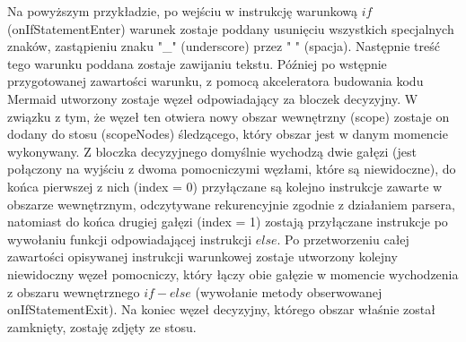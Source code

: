 	Na powyższym przykładzie, po wejściu w instrukcję warunkową $if$ (onIfStatementEnter) warunek zostaje poddany usunięciu wszystkich specjalnych znaków, zastąpieniu znaku "\_" (underscore) przez " " (spacja). Następnie treść tego warunku poddana zostaje zawijaniu tekstu. Później po wstępnie przygotowanej zawartości warunku, z pomocą akceleratora budowania kodu Mermaid utworzony zostaje węzeł odpowiadający za bloczek decyzyjny. W związku z tym, że węzeł ten otwiera nowy obszar wewnętrzny (scope) zostaje on dodany do stosu (scopeNodes) śledzącego, który obszar jest w danym momencie wykonywany. Z bloczka decyzyjnego domyślnie wychodzą dwie gałęzi (jest połączony na wyjściu z dwoma pomocniczymi węzłami, które są niewidoczne), do końca pierwszej z nich (index = 0) przyłączane są kolejno instrukcje zawarte w obszarze wewnętrznym, odczytywane rekurencyjnie zgodnie z działaniem parsera, natomiast do końca drugiej gałęzi (index = 1) zostają przyłączane instrukcje po wywołaniu funkcji odpowiadającej instrukcji $else$. Po przetworzeniu całej zawartości opisywanej instrukcji warunkowej zostaje utworzony kolejny niewidoczny węzeł pomocniczy, który łączy obie gałęzie w momencie wychodzenia z obszaru wewnętrznego $if-else$ (wywołanie metody obserwowanej onIfStatementExit). Na koniec węzeł decyzyjny, którego obszar właśnie został zamknięty, zostaję zdjęty ze stosu.
	
	
	